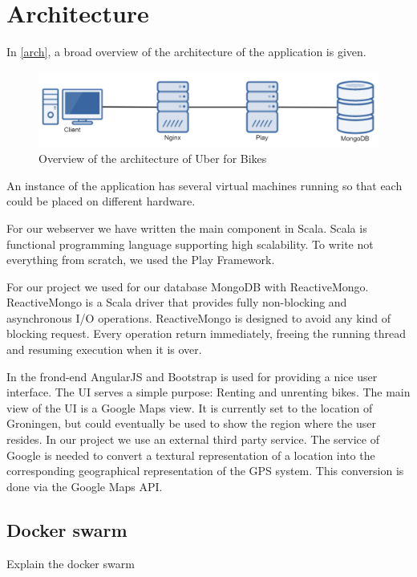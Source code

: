 \section{Architecture}
In \autoref{arch}, a broad overview of the architecture of the application is given. 

    \begin{figure}[H]
		\centering
		\includegraphics[width=1.0\textwidth]{images/Architecture.png}
		\caption{Overview of the architecture of Uber for Bikes}
		\label{arch}
	\end{figure}
	
An instance of the application has several virtual machines running so that each could be placed on different hardware. 

For our webserver we have written the main component in Scala. Scala is functional programming language supporting high scalability. To write not everything from scratch, we used the Play Framework. 

For our project we used for our database MongoDB with ReactiveMongo. ReactiveMongo is a Scala driver that provides fully non-blocking and asynchronous I/O operations. ReactiveMongo is designed to avoid any kind of blocking request. Every operation return immediately, freeing the running thread and resuming execution when it is over.

In the frond-end AngularJS and Bootstrap is used for providing a nice user interface. The UI serves a simple purpose: Renting and unrenting bikes. The main view of the UI is a Google Maps view. It is currently set to the location of Groningen, but could eventually be used to show the region where the user resides.
In our project we use an external third party service. The service of Google is needed to convert a textural representation of a location into the corresponding geographical representation of the GPS system. This conversion is done via the Google Maps API.


\subsection{Docker swarm}

Explain the docker swarm